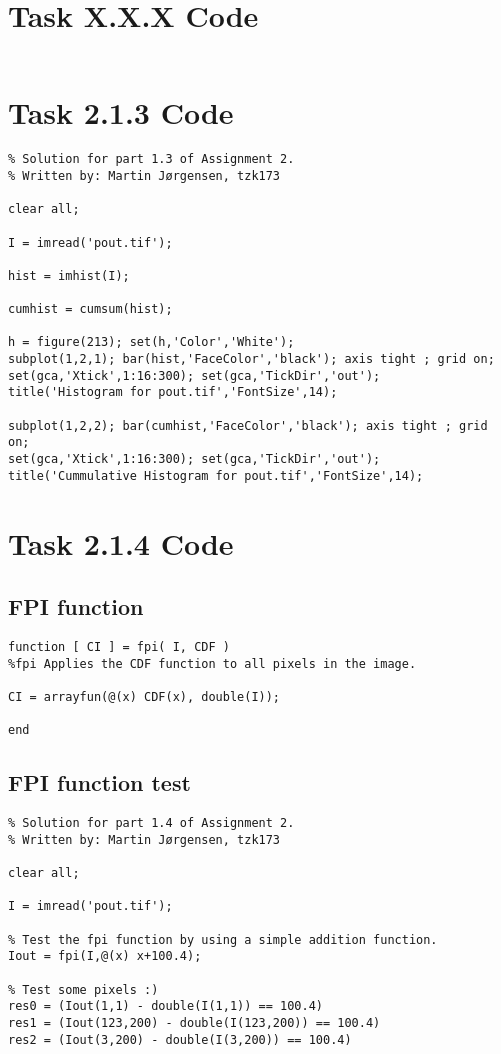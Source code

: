 \section{Task X.X.X Code}
\begin{verbatim}
\end{verbatim}


\section{Task 2.1.3 Code}
\begin{verbatim}
% Solution for part 1.3 of Assignment 2.
% Written by: Martin Jørgensen, tzk173

clear all;

I = imread('pout.tif');

hist = imhist(I);

cumhist = cumsum(hist);

h = figure(213); set(h,'Color','White');
subplot(1,2,1); bar(hist,'FaceColor','black'); axis tight ; grid on;
set(gca,'Xtick',1:16:300); set(gca,'TickDir','out');
title('Histogram for pout.tif','FontSize',14);

subplot(1,2,2); bar(cumhist,'FaceColor','black'); axis tight ; grid on;
set(gca,'Xtick',1:16:300); set(gca,'TickDir','out');
title('Cummulative Histogram for pout.tif','FontSize',14);
\end{verbatim}

\section{Task 2.1.4 Code}
\subsection{FPI function}
\begin{verbatim}
function [ CI ] = fpi( I, CDF )
%fpi Applies the CDF function to all pixels in the image.

CI = arrayfun(@(x) CDF(x), double(I));

end
\end{verbatim}

\subsection{FPI function test}
\begin{verbatim}
% Solution for part 1.4 of Assignment 2.
% Written by: Martin Jørgensen, tzk173

clear all;

I = imread('pout.tif');

% Test the fpi function by using a simple addition function.
Iout = fpi(I,@(x) x+100.4);

% Test some pixels :)
res0 = (Iout(1,1) - double(I(1,1)) == 100.4)
res1 = (Iout(123,200) - double(I(123,200)) == 100.4)
res2 = (Iout(3,200) - double(I(3,200)) == 100.4)
\end{verbatim}